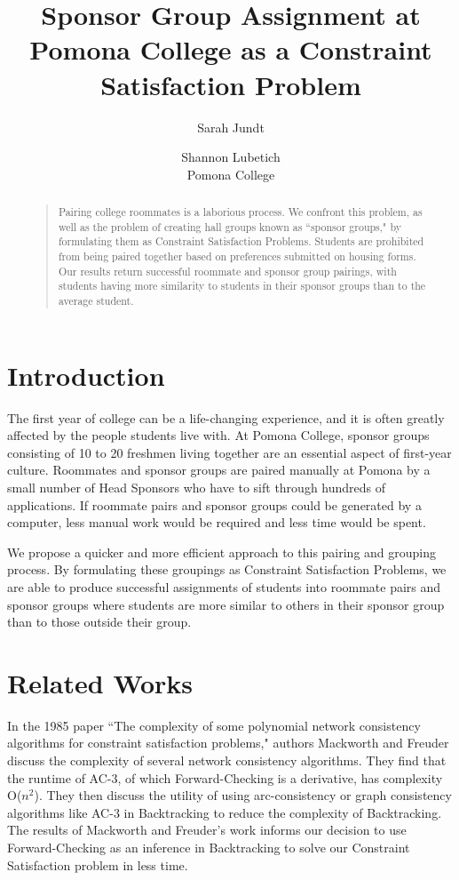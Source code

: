 \documentclass[letterpaper]{article}
\title{Sponsor Group Assignment at Pomona College as a Constraint Satisfaction Problem}
\author{Sarah Jundt \and Shannon Lubetich\\
Pomona College\\}
\begin{document}
\maketitle

\begin{abstract}
\begin{quote}
Pairing college roommates is a laborious process. We confront this problem, as well as the problem of  creating hall groups known as ``sponsor groups," by formulating them as Constraint Satisfaction Problems. Students are prohibited from being paired together based on preferences submitted on housing forms. Our results return successful roommate and sponsor group pairings, with students having more similarity to students in their sponsor groups than to the average student. 
\end{quote}
\end{abstract}

\section{Introduction}

The first year of college can be a life-changing experience, and it is often greatly affected by the people students live with. At Pomona College, sponsor groups consisting of 10 to 20 freshmen living together are an essential aspect of first-year culture. Roommates and sponsor groups are paired manually at Pomona by a small number of Head Sponsors who have to sift through hundreds of applications. If roommate pairs and sponsor groups could be generated by a computer, less manual work would be required and less time would be spent.

We propose a quicker and more efficient approach to this pairing and grouping process. By formulating these groupings as Constraint Satisfaction Problems, we are able to produce successful assignments of students into roommate pairs and sponsor groups where students are more similar to others in their sponsor group than to those outside their group.

\section{Related Works}
In the 1985 paper ``The complexity of some
polynomial network consistency algorithms for constraint
satisfaction problems," authors Mackworth and Freuder discuss the complexity of several network consistency algorithms. They find that the runtime of AC-3, of which Forward-Checking is a derivative, has complexity  O($n^2$). They then discuss the utility of using arc-consistency or graph consistency algorithms like AC-3 in Backtracking to reduce the complexity of Backtracking. The results of Mackworth  and Freuder's work informs our decision to use Forward-Checking as an inference in Backtracking to solve our Constraint Satisfaction problem in less time.
\end{document}

